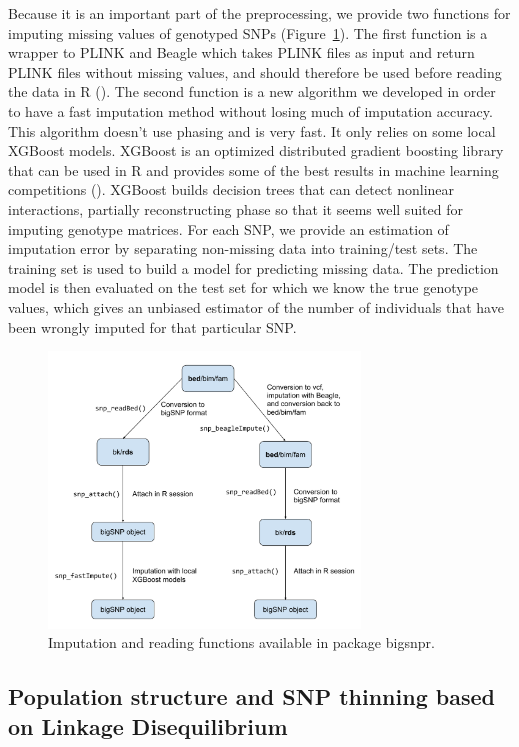 \documentclass{bioinfo}
\begin{document}
\begin{methods}
Because it is an important part of the preprocessing, we provide two functions for imputing missing values of genotyped SNPs (Figure~\ref{fig:impute}). The first function is a wrapper to PLINK and Beagle which takes PLINK files as input and return PLINK files without missing values, and should therefore be used before reading the data in R (\cite{Browning2009}). The second function is a new algorithm we developed in order to have a fast imputation method without losing much of imputation accuracy. This algorithm doesn't use phasing and is very fast. It only relies on some local XGBoost models. XGBoost is an optimized distributed gradient boosting library that can be used in R and provides some of the best results in machine learning competitions (\cite{Chen2016}). XGBoost builds decision trees that can detect nonlinear interactions, partially reconstructing phase so that it seems well suited for imputing genotype matrices. For each SNP, we provide an estimation of imputation error by separating non-missing data into training/test sets. The training set is used to build a model for predicting missing data. The prediction model is then evaluated on the test set for which we know the true genotype values, which gives an unbiased estimator of the number of individuals that have been wrongly imputed for that particular SNP.

\begin{figure}[!tpb]
\centerline{\includegraphics[width=235pt]{imputation.pdf}}
\caption{Imputation and reading functions available in package bigsnpr.}\label{fig:impute}
\end{figure}


\subsection{Population structure and SNP thinning based on Linkage Disequilibrium} 


\end{methods}
\end{document}
